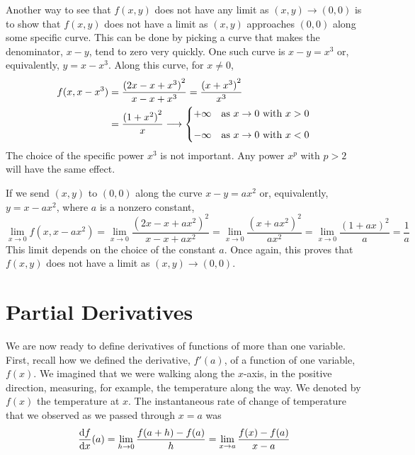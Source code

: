 \begin{eg}
Another way to see that  $f(x,y)$ does not have any limit 
as $(x,y)\rightarrow (0,0)$ is to show that $f(x,y)$ does not have  a limit
as $(x,y)$ approaches $(0,0)$ along some specific curve. This can be done
by picking a curve  that makes the denominator,
$x-y$, tend to zero very quickly. One such curve is $x-y=x^3$ or, equivalently,
$y=x-x^3$.  Along this
curve, for $x\ne 0$,
\begin{align*}
f(x,x-x^3)&=\frac{{(2x-x+x^3)}^2}{x-x+x^3}
=\frac{{(x+x^3)}^2}{x^3} \\
&=\frac{{(1+x^2)}^2}{x}\longrightarrow
\begin{cases}+\infty & \text{as $x\rightarrow 0$ with $x>0$}\\
        \noalign{\vskip0.1in}
       -\infty & \text{as $x\rightarrow 0$ with $x<0$}
\end{cases}
\end{align*}
The choice of the specific power $x^3$ is not important. Any power
$x^p$ with $p>2$ will have the same effect. 

If we send $(x,y)$ to  $(0,0)$ 
along the curve  $x-y=ax^2$ or, equivalently, $y=x-ax^2$, where $a$ is a
nonzero constant,
$$
\lim_{x\rightarrow 0}f(x,x-ax^2)
=\lim_{x\rightarrow 0}\frac{{(2x-x+ax^2)}^2}{x-x+ax^2}
=\lim_{x\rightarrow 0}\frac{{(x+ax^2)}^2}{ax^2}
=\lim_{x\rightarrow 0}\frac{{(1+ax)}^2}{a}
=\frac{1}{a}
$$
This limit depends on the choice of the constant $a$. Once again, this
proves that $f(x,y)$ does not have a limit as $(x,y)\rightarrow (0,0)$.
\end{eg}

\section{Partial Derivatives}\label{sec partials}
We are now ready to define derivatives of functions of more than one variable.
First, recall how we defined the derivative, $f'(a)$, of a function
of one variable, $f(x)$. We imagined that we were walking along the $x$-axis,
in the positive direction, measuring, for example, the temperature
along the way. We denoted by $f(x)$ the temperature at $x$. The instantaneous rate of change of temperature that we observed as we passed through $x=a$ was
\begin{equation*}
\diff{f}{x}(a) =\lim_{h\rightarrow 0}\frac{f(a+h) - f(a)}{h}
      =\lim_{x\rightarrow a}\frac{f(x) - f(a)}{x-a}
\end{equation*}

